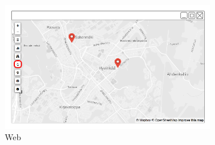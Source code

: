 \begin{figure}[ht]
  \centering
  \begin{subfigure}[b]{0.6\textwidth}
    \includegraphics[width=\textwidth]
      {img/c02-application/png/web-basemap-search.png}
    \caption{Web}
  \end{subfigure}
  ~
  \begin{subfigure}[b]{0.2\textwidth}

\end{subfigure}
\end{figure}
